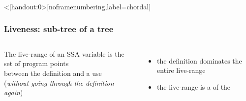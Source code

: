 \begin{frame}<|handout:0>[noframenumbering,label=chordal]
  \frametitle{Liveness: sub-tree of a tree}
  \begin{columns}
      \begin{block}{The live-range of an SSA variable is}
        the set of program points\\ \alert{between the definition and a use}\\
        \footnotesize (\emph{without going through the definition again})
      \end{block}
    \begin{itemize}
      \item<2> the definition dominates the entire live-range
      \item<2> the live-range is a  of the 
    \end{itemize}
  \end{columns}
\end{frame}

